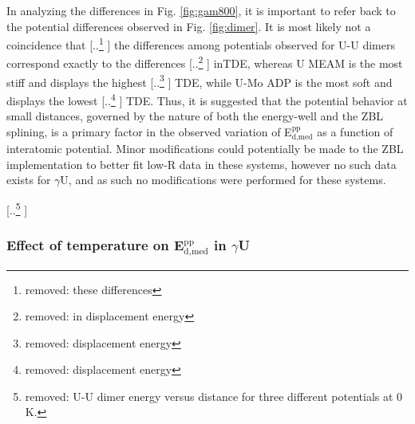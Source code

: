 \documentclass[review]{elsarticle}
\providecommand{\DIFaddtex}[1]{{\protect\color{blue} \sf #1}} %
\providecommand{\DIFdeltex}[1]{{\protect\color{red} [..\footnote{removed: #1} ]}} %
\providecommand{\DIFaddbegin}{} %
\providecommand{\DIFaddend}{} %
\providecommand{\DIFdelbegin}{} %
\providecommand{\DIFdelend}{} %
\providecommand{\DIFdelFL}[1]{\DIFdel{#1}} %
\providecommand{\DIFadd}[1]{\texorpdfstring{\DIFaddtex{#1}}{#1}} %
\providecommand{\DIFdel}[1]{\texorpdfstring{\DIFdeltex{#1}}{}} %
\newcommand{\DIFscaledelfig}{0.5}
\newlength{\DIFdelgraphicswidth} %
\newlength{\DIFdelgraphicsheight} %
\newcommand{\DIFaddincludegraphics}[2][]{{\color{blue}\fbox{\DIFOincludegraphics[#1]{#2}}}} %
\newcommand{\DIFdelincludegraphics}[2][]{%
\sbox{\DIFdelgraphicsbox}{\DIFOincludegraphics[#1]{#2}}%
\settoboxwidth{\DIFdelgraphicswidth}{\DIFdelgraphicsbox} %
\settoboxtotalheight{\DIFdelgraphicsheight}{\DIFdelgraphicsbox} %
\scalebox{\DIFscaledelfig}{%
\parbox[b]{\DIFdelgraphicswidth}{\usebox{\DIFdelgraphicsbox}\\[-\baselineskip] \rule{\DIFdelgraphicswidth}{0em}}\llap{\resizebox{\DIFdelgraphicswidth}{\DIFdelgraphicsheight}{%
\setlength{\unitlength}{\DIFdelgraphicswidth}%
\begin{picture}(1,1)%
\thicklines\linethickness{2pt} %
{\color[rgb]{1,0,0}\put(0,0){\framebox(1,1){}}}%
{\color[rgb]{1,0,0}\put(0,0){\line( 1,1){1}}}%
{\color[rgb]{1,0,0}\put(0,1){\line(1,-1){1}}}%
\end{picture}%
}\hspace*{3pt}}} %
} %
\DeclareRobustCommand{\DIFaddbegin}{\DIFOaddbegin \let\includegraphics\DIFaddincludegraphics} %
\DeclareRobustCommand{\DIFaddend}{\DIFOaddend \let\includegraphics\DIFOincludegraphics} %
\DeclareRobustCommand{\DIFdelbegin}{\DIFOdelbegin \let\includegraphics\DIFdelincludegraphics} %
\DeclareRobustCommand{\DIFdelend}{\DIFOaddend \let\includegraphics\DIFOincludegraphics} %
\begin{document}
\DIFadd{In analyzing the differences in Fig. \ref{fig:gam800}, it is important to refer back to the potential differences observed in Fig. \ref{fig:dimer}. }\DIFaddend It is most likely not a coincidence that \DIFdelbegin \DIFdel{these differences }\DIFdelend \DIFaddbegin \DIFadd{the differences among potentials observed for U-U dimers }\DIFaddend correspond exactly to the differences \DIFdelbegin \DIFdel{in displacement energy}\DIFdelend \DIFaddbegin \DIFadd{inTDE}\DIFaddend , whereas U MEAM is the most stiff and displays the highest \DIFdelbegin \DIFdel{displacement energy}\DIFdelend \DIFaddbegin \DIFadd{TDE}\DIFaddend , while U-Mo ADP is the most soft and displays the lowest \DIFdelbegin \DIFdel{displacement energy}\DIFdelend \DIFaddbegin \DIFadd{TDE}\DIFaddend . Thus, it is suggested that the potential behavior at small distances, governed by the nature of both the energy-well and the ZBL splining, is a primary factor in the observed variation of E$^{\textrm{pp}}_{\textrm{d,med}}$ as a function of interatomic potential. Minor modifications could potentially be made to the ZBL implementation to better fit low-R data in these systems, however no such data exists for $\gamma$U, and as such no modifications were performed for these systems.

\DIFdelbegin %
{%
\DIFdelFL{U-U dimer energy versus distance for three different potentials at 0 K.}}
\DIFdelend \DIFaddbegin \FloatBarrier
\DIFaddend 

\subsubsection{Effect of temperature on E$^{\textrm{pp}}_{\textrm{d,med}}$ in $\gamma$U}
\end{document}
